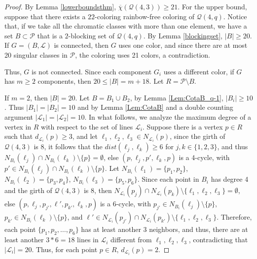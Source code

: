 \documentclass[12pt]{article}
\begin{document}
\begin{proof}
    By Lemma \ref{lowerboundsthm}, $ \overline{\chi}(\mathcal{Q}(4,3))\ge21$.
%
    For the upper bound, suppose that there exists a $22$-coloring rainbow-free coloring of $\mathcal{Q}(4,q)$.
    Notice that, if we take all the chromatic classes with more than one element, we have a set $B\subset \mathcal{P}$ that is a $2$-blocking set of ${\mathcal{Q}(4,q)}$.
    By Lemma \ref{blockingset}, $|B|\ge20$. 
    If $G=(B,\mathcal{L})$ is connected, then $G$ uses one color, and since there are at most 20 singular classes in $\mathcal{P}$, the coloring uses 21 colors, a contradiction.
    
    Thus, $G$ is not connected. Since each component $G_i$ uses a different color, if $G$ has $m\ge2$ components, then $20\le|B|=m+18$. Let $R=\mathcal{P}\setminus B$.

    If $m=2$, then $|B|=20$. Let $B=B_1\cup B_2$, by Lemma \ref{Lem:CotaB_q-1}, $|B_i|\ge10$.
    Thus $|B_1|=|B_2|=10$ and by Lemma \ref{Lem:CotaB} and a double counting argument $|\mathcal{L}_1|=|\mathcal{L}_2|=10$. In what follows, we analyze the maximum degree of a vertex in $R$ with respect to the set of lines $\mathcal{L}_i$. Suppose there is a vertex $p\in R$ such that $d_{\mathcal{L}_i}(p)\ge3$, and let $\ell_1,\ell_2,\ell_3\in N_{\mathcal{L}_i}(p)$, since the girth of $\mathcal{Q}(4,3)$ is 8, it follows that the $dist(\ell_j,\ell_k)\ge6$   for $j,k\in\{1,2,3\}$, and thus $N_{B_i}(\ell_j)\cap N_{B_i}(\ell_k)\setminus\{p\}=\emptyset$, else $(p,\ell_j,p',\ell_k,p)$ is a 4-cycle, with $p'\in N_{B_i}(\ell_j)\cap N_{B_i}(\ell_k)\setminus\{p\}$. 
    Let $N_{B_i}(\ell_1)=\{p_1,p_2\}$, $N_{B_i}(\ell_2)=\{p_3,p_4\}$, $N_{B_i}(\ell_3)=\{p_5,p_6\}$. Since each point in $B_i$ has degree 4 and the girth of $\mathcal{Q}(4,3)$ is 8, then $N_{\mathcal{L}_i}(p_j)\cap N_{\mathcal{L}_i}(p_k)\setminus\{\ell_1,\ell_2,\ell_3\}=\emptyset$, else $(p,\ell_j,p_{j'},\ell',p_{k'},\ell_k,p)$ is a 6-cycle, with $p_{j'}\in N_{B_i}(\ell_j)\setminus\{p\}$, $p_{k'}\in N_{B_i}(\ell_k)\setminus\{p\}$, and $\ell'\in N_{\mathcal{L}_i}(p_{j'})\cap N_{\mathcal{L}_i}(p_{k'})\setminus\{\ell_1,\ell_2,\ell_3\}$. 
    Therefore, each point $\{p_1,p_2,\dots,p_6\}$ has at least another 3 neighbors, and thus, there are at least another $3*6=18$ lines in $\mathcal{L}_i$ different from $\ell_1,\ell_2,\ell_3$, contradicting that $|\mathcal{L}_i|=20$. Thus, for each point $p\in R$, $d_{\mathcal{L}_i}(p)=2$.


\end{proof}
\end{document}
